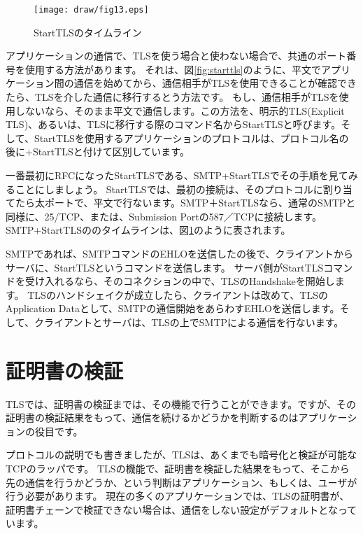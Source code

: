 \begin{figure}[htbp]
	\texttt{[image: draw/fig13.eps]}
	\caption{StartTLSのタイムライン}
	\label{fig:starttls_timeline}
\end{figure}

アプリケーションの通信で、TLSを使う場合と使わない場合で、共通のポート番号を使用する方法があります。
それは、図\ref{fig:starttls}のように、平文でアプリケーション間の通信を始めてから、通信相手がTLSを使用できることが確認できたら、TLSを介した通信に移行するとう方法です。
もし、通信相手がTLSを使用しないなら、そのまま平文で通信します。この方法を、明示的TLS(Explicit TLS)、あるいは、TLSに移行する際のコマンド名からStartTLSと呼びます。そして、StartTLSを使用するアプリケーションのプロトコルは、プロトコル名の後に+StartTLSと付けて区別しています。

一番最初にRFCになったStartTLSである、SMTP+StartTLSでその手順を見てみることにしましょう。
StartTLSでは、最初の接続は、そのプロトコルに割り当てたら太ポートで、平文で行ないます。SMTP＋StartTLSなら、通常のSMTPと同様に、25/TCP、または、Submission Portの587／TCPに接続します。
SMTP+StartTLSののタイムラインは、図\ref{fig:starttls_timeline}のように表されます。





SMTPであれば、SMTPコマンドのEHLOを送信したの後で、クライアントからサーバに、StartTLSというコマンドを送信します。
サーバ側がStartTLSコマンドを受け入れるなら、そのコネクションの中で、TLSのHandshakeを開始します。
TLSのハンドシェイクが成立したら、クライアントは改めて、TLSのApplication Dataとして、SMTPの通信開始をあらわすEHLOを送信します。そして、クライアントとサーバは、TLSの上でSMTPによる通信を行ないます。


\section{証明書の検証}
TLSでは、証明書の検証までは、その機能で行うことができます。ですが、その証明書の検証結果をもって、通信を続けるかどうかを判断するのはアプリケーションの役目です。

プロトコルの説明でも書きましたが、TLSは、あくまでも暗号化と検証が可能なTCPのラッパです。
TLSの機能で、証明書を検証した結果をもって、そこから先の通信を行うかどうか、という判断はアプリケーション、もしくは、ユーザが行う必要があります。
現在の多くのアプリケーションでは、TLSの証明書が、証明書チェーンで検証できない場合は、通信をしない設定がデフォルトとなっています。

